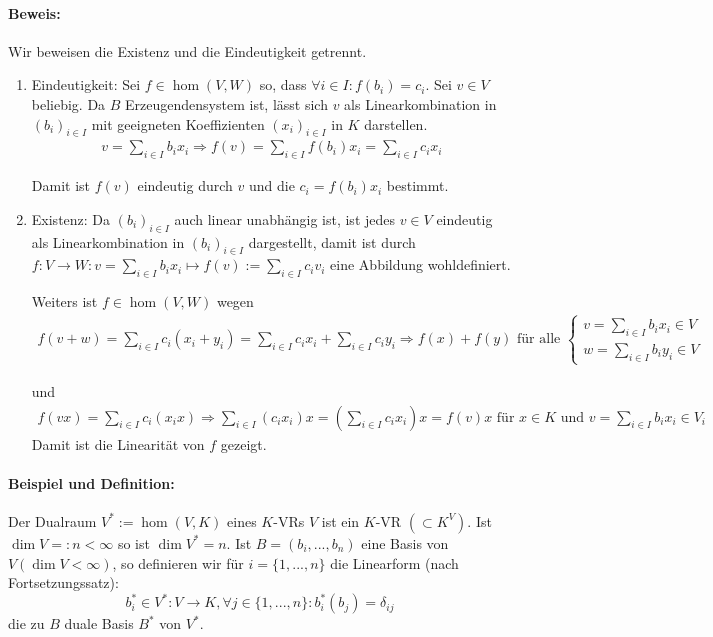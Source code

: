 \paragraph{Beweis:}
	Wir beweisen die Existenz und die Eindeutigkeit getrennt. 
	\begin{enumerate}
		\item Eindeutigkeit: Sei $f\in \hom(V,W)$ so, dass $\forall i\in I: f(b_i)=c_i$. Sei $v\in V$ beliebig. Da $ B $ Erzeugendensystem ist, lässt sich $ v $ als Linearkombination in $(b_i)_{i\in I}$ mit geeigneten Koeffizienten $(x_i)_{i\in I}$ in $ K $ darstellen.
			\begin{gather*}
    				v=\sum_{i\in I}b_ix_i \Rightarrow f(v) = \sum_{i\in I} f(b_i)x_i = \sum_{i\in I}c_ix_i
    			\end{gather*}
    
    		Damit ist $ f(v) $ eindeutig durch $ v $ und die $c_i = f(b_i)x_i$ bestimmt.
    
    		\item Existenz: Da $(b_i)_{i\in I}$ auch linear unabhängig ist, ist jedes $v\in V$ eindeutig als Linearkombination in $(b_i)_{i\in I}$ dargestellt, damit ist durch $f:V\to W: v=\sum_{i\in I}b_ix_i \mapsto f(v):=\sum_{i\in I}c_iv_i$ eine Abbildung wohldefiniert.
    
	Weiters ist $f\in\hom(V,W)$ wegen
	\begin{gather*}
		f(v+w) =\sum_{i\in I}c_i(x_i+y_i)=\sum_{i\in I}c_ix_i+ \sum_{i\in I}c_iy_i\Rightarrow f(x) + f(y) \text{ für alle }\left\{
			\begin{array}{l}
				v=\sum_{i\in I}b_ix_i \in V\\
     				w=\sum_{i\in I}b_iy_i \in V
     			\end{array}
     		\right.
     \end{gather*}
    
    und
    \begin{gather*}
    	f(vx) =\sum_{i\in I}c_i(x_ix)\Rightarrow\sum_{i\in I}(c_ix_i)x = (\sum_{i\in I}c_ix_i)x= f(v)x \text{ für }  x\in K\text{ und }v= \sum_{i\in I}b_ix_i \in V_i
    \end{gather*}
    Damit ist die Linearität von $ f $ gezeigt.
    \end{enumerate}
    
\paragraph{Beispiel und Definition:}
	Der Dualraum $V^\ast := \hom(V,K)$ eines $K$-VRs $V$ ist ein $ K $-VR $(\subset K^V)$. Ist $\dim V=:n<\infty$ so ist $\dim V^\ast=n$.
	Ist $B=(b_i, ... ,b_n)$ eine Basis von $ V (\dim V < \infty)$, so definieren wir für $ i = \{1, ... ,n\} $ die Linearform (nach Fortsetzungssatz):
	\begin{equation*}
		b_i^\ast\in V^*:V\to K, \forall j\in \{1,...,n\}:b_i^*(b_j)=\delta_{ij}
	\end{equation*} die zu $ B $ duale Basis $ B^* $ von $V^\ast$.


